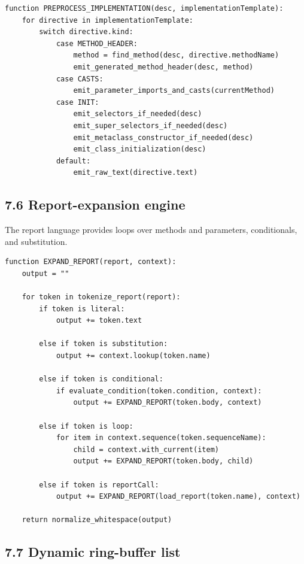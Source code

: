 \documentclass[11pt]{article}
\begin{document}
\begin{verbatim}
function PREPROCESS_IMPLEMENTATION(desc, implementationTemplate):
    for directive in implementationTemplate:
        switch directive.kind:
            case METHOD_HEADER:
                method = find_method(desc, directive.methodName)
                emit_generated_method_header(desc, method)
            case CASTS:
                emit_parameter_imports_and_casts(currentMethod)
            case INIT:
                emit_selectors_if_needed(desc)
                emit_super_selectors_if_needed(desc)
                emit_metaclass_constructor_if_needed(desc)
                emit_class_initialization(desc)
            default:
                emit_raw_text(directive.text)
\end{verbatim}

\subsection{7.6 Report-expansion engine}\label{report-expansion-engine}

The report language provides loops over methods and parameters,
conditionals, and substitution.

\begin{verbatim}
function EXPAND_REPORT(report, context):
    output = ""

    for token in tokenize_report(report):
        if token is literal:
            output += token.text

        else if token is substitution:
            output += context.lookup(token.name)

        else if token is conditional:
            if evaluate_condition(token.condition, context):
                output += EXPAND_REPORT(token.body, context)

        else if token is loop:
            for item in context.sequence(token.sequenceName):
                child = context.with_current(item)
                output += EXPAND_REPORT(token.body, child)

        else if token is reportCall:
            output += EXPAND_REPORT(load_report(token.name), context)

    return normalize_whitespace(output)
\end{verbatim}

\subsection{7.7 Dynamic ring-buffer
list}\label{dynamic-ring-buffer-list}
\end{document}
